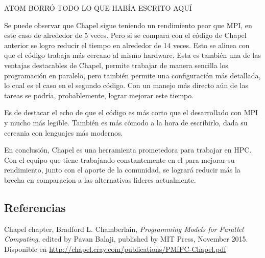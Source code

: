 \documentclass[10pt]{extarticle}
\begin{document}
ATOM BORRÓ TODO LO QUE HABÍA ESCRITO AQUÍ

Se puede observar que Chapel sigue teniendo un rendimiento peor que MPI, en este caso de alrededor de 5 veces. Pero si se compara con el código de Chapel anterior se logro reducir el tiempo en alrededor de 14 veces. Esto se alinea con que el código trabaja más cercano al mismo hardware. Esta es también una de las ventajas destacables de Chapel, permite trabajar de manera sencilla los programación en paralelo, pero también permite una configuración más detallada, lo cual es el caso en el segundo código. Con un manejo más directo aún de las tareas se podría, probablemente, lograr mejorar este tiempo.

Es de destacar el echo de que el código es más corto que el desarrollado con MPI y mucho más legible. También es más cómodo a la hora de escribirlo, dada su cercania con lenguajes más modernos.

En conclusión, Chapel es una herramienta prometedora para trabajar en HPC. Con el equipo que tiene trabajando constantemente en el para mejorar su rendimiento, junto con el aporte de la comunidad, se logrará reducir más la brecha en comparacion a las alternativas lideres actualmente.


\subsection*{Referencias}
Chapel chapter, Bradford L. Chamberlain, \textit{Programming Models for Parallel Computing}, edited by Pavan Balaji, published by MIT Press, November 2015. Disponible en \href{http://chapel.cray.com/publications/PMfPC-Chapel.pdf}{\color{blue!60}http://chapel.cray.com/publications/PMfPC-Chapel.pdf}

%
\end{document}
